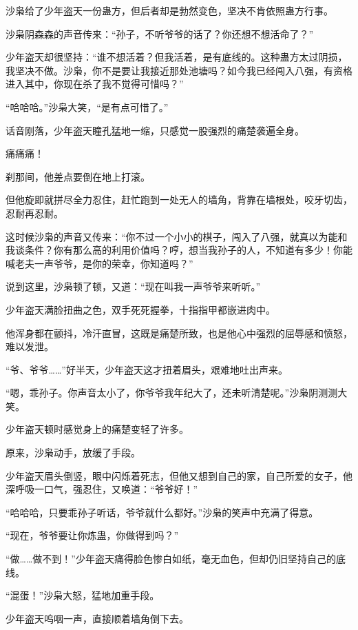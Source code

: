
\begin{this_body}

沙枭给了少年盗天一份蛊方，但后者却是勃然变色，坚决不肯依照蛊方行事。

沙枭阴森森的声音传来：“孙子，不听爷爷的话了？你还想不想活命了？”

少年盗天却很坚持：“谁不想活着？但我活着，是有底线的。这种蛊方太过阴损，我坚决不做。沙枭，你不是要让我接近那处池塘吗？如今我已经闯入八强，有资格进入其中，你现在杀了我不觉得可惜吗？”

“哈哈哈。”沙枭大笑，“是有点可惜了。”

话音刚落，少年盗天瞳孔猛地一缩，只感觉一股强烈的痛楚袭遍全身。

痛痛痛！

刹那间，他差点要倒在地上打滚。

但他旋即就拼尽全力忍住，赶忙跑到一处无人的墙角，背靠在墙根处，咬牙切齿，忍耐再忍耐。

这时候沙枭的声音又传来：“你不过一个小小的棋子，闯入了八强，就真以为能和我谈条件？你有那么高的利用价值吗？哼，想当我孙子的人，不知道有多少！你能喊老夫一声爷爷，是你的荣幸，你知道吗？”

说到这里，沙枭顿了顿，又道：“现在叫我一声爷爷来听听。”

少年盗天满脸扭曲之色，双手死死握拳，十指指甲都嵌进肉中。

他浑身都在颤抖，冷汗直冒，这既是痛楚所致，也是他心中强烈的屈辱感和愤怒，难以发泄。

“爷、爷爷……”好半天，少年盗天这才扭着眉头，艰难地吐出声来。

“嗯，乖孙子。你声音太小了，你爷爷我年纪大了，还未听清楚呢。”沙枭阴测测大笑。

少年盗天顿时感觉身上的痛楚变轻了许多。

原来，沙枭动手，放缓了手段。

少年盗天眉头倒竖，眼中闪烁着死志，但他又想到自己的家，自己所爱的女子，他深呼吸一口气，强忍住，又唤道：“爷爷好！”

“哈哈哈，只要乖孙子听话，爷爷就什么都好。”沙枭的笑声中充满了得意。

“现在，爷爷要让你炼蛊，你做得到吗？”

“做……做不到！”少年盗天痛得脸色惨白如纸，毫无血色，但却仍旧坚持自己的底线。

“混蛋！”沙枭大怒，猛地加重手段。

少年盗天呜咽一声，直接顺着墙角倒下去。


\end{this_body}
